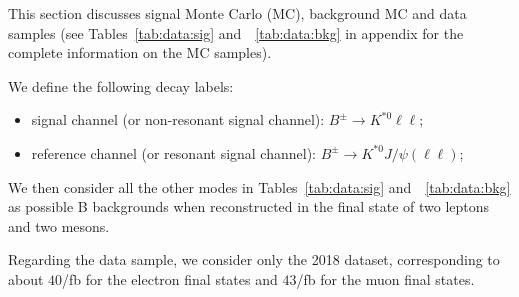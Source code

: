 This section discusses signal Monte Carlo (MC), background MC and data samples
(see Tables~\ref{tab:data:sig} and~~\ref{tab:data:bkg} in appendix for the complete information
on the MC samples).

We define the following decay labels:
\begin{itemize}
\setlength{\itemsep}{0pt}%
\setlength{\parskip}{0pt}%
  \item signal channel (or non-resonant signal channel): $B^\pm \to K^{*0}\ell\ell$;
  \item reference channel (or resonant signal channel): $B^\pm \to K^{*0}J/\psi(\ell\ell)$;
\end{itemize}

We then consider all the other modes in Tables~\ref{tab:data:sig} and~~\ref{tab:data:bkg}
as possible B backgrounds when reconstructed in the final state of two leptons and two mesons.

Regarding the data sample, we consider only the 2018 dataset, corresponding to about
$40$/fb for the electron final states and $43$/fb for the muon final states.




